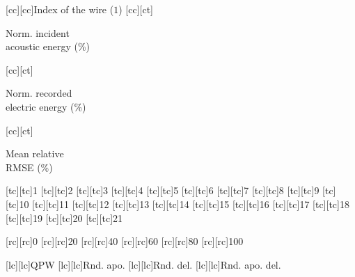 [cc][cc]{\footnotesize Index of the wire ($1$)}
[cc][ct]{\footnotesize \parbox[b]{3cm}{\centering Norm. incident\\acoustic energy (\si{\percent})}}
[cc][ct]{\footnotesize \parbox[b]{3cm}{\centering Norm. recorded\\electric energy (\si{\percent})}}
[cc][ct]{\footnotesize \parbox[b]{3cm}{\centering Mean relative\\\acs{RMSE} (\si{\percent})}}

[tc][tc]{\scriptsize 1}
[tc][tc]{\scriptsize 2}
[tc][tc]{\scriptsize 3}
[tc][tc]{\scriptsize 4}
[tc][tc]{\scriptsize 5}
[tc][tc]{\scriptsize 6}
[tc][tc]{\scriptsize 7}
[tc][tc]{\scriptsize 8}
[tc][tc]{\scriptsize 9}
[tc][tc]{\scriptsize 10}
[tc][tc]{\scriptsize 11}
[tc][tc]{\scriptsize 12}
[tc][tc]{\scriptsize 13}
[tc][tc]{\scriptsize 14}
[tc][tc]{\scriptsize 15}
[tc][tc]{\scriptsize 16}
[tc][tc]{\scriptsize 17}
[tc][tc]{\scriptsize 18}
[tc][tc]{\scriptsize 19}
[tc][tc]{\scriptsize 20}
[tc][tc]{\scriptsize 21}

[rc][rc]{\scriptsize 0}
[rc][rc]{\scriptsize 20}
[rc][rc]{\scriptsize 40}
[rc][rc]{\scriptsize 60}
[rc][rc]{\scriptsize 80}
[rc][rc]{\scriptsize 100}

[lc][lc]{\footnotesize \acs{QPW}}
[lc][lc]{\footnotesize Rnd. apo.}
[lc][lc]{\footnotesize Rnd. del.}
[lc][lc]{\footnotesize Rnd. apo. del.}

